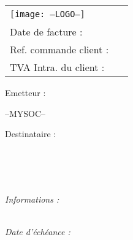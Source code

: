 \documentclass[a4paper, oneside, 10pt, french]{article}
\begin{document}
\begin{tabularx}{\textwidth}{X X}
    \vspace{0pt} 
    \texttt{[image: --LOGO--]}
    & 
    \vspace{0pt}
   \raggedleft
	\textcolor{violet}{\textsc{\Large \jsonTitleValue \  \jsonRefValue}}\\
	Date de facture :   \jsonDatecValue\\ \jsonPeriodValue
	Ref. commande client :  \jsonRefClientValue\\
	TVA Intra. du  client : \jsonToValueTva \\
\end{tabularx}


\begin{minipage}[t]{0.40\textwidth}
{\small Emetteur :}\\
\begin{fminipage}
--MYSOC--
\end{fminipage}
\end{minipage}
\hspace{1cm}
\begin{minipage}[t]{0.52\textwidth}
{\small Destinataire :}

\begin{fminipage}
\textbf{\large \jsonToValueName}\\
\jsonToValueAddressStreet\\
\textsc{\jsonToValueAddressZip \ \jsonToValueAddressCity}\\
\begin{minipage}{\textwidth}
\flushright
{\tiny \jsonToValueCodeClient}
\end{minipage}
\end{fminipage}
\end{minipage}

\begin{minipage}[t]{0.60\textwidth}
{\small \it Informations :}\\
\jsonNotesValue \\
\end{minipage}
\hspace{1cm}
\begin{minipage}[t]{0.32\textwidth}
\begin{flushright}
{\it Date d'échéance : \textbf{\jsonDateechValue}}
\end{flushright}
\end{minipage}
\end{document}
